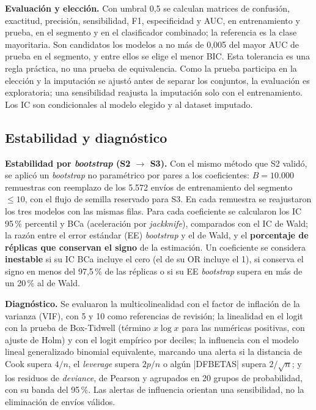 \documentclass[11pt,a4paper]{article}
\begin{document}
\textbf{Evaluación y elección.} Con umbral 0,5 se calculan matrices de confusión, exactitud, precisión, sensibilidad, F1, especificidad y AUC, en entrenamiento y prueba, en el segmento y en el clasificador combinado; la referencia es la clase mayoritaria. Son candidatos los modelos a no más de 0,005 del mayor AUC de prueba en el segmento, y entre ellos se elige el menor BIC. Esta tolerancia es una regla práctica, no una prueba de equivalencia. Como la prueba participa en la elección y la imputación se ajustó antes de separar los conjuntos, la evaluación es exploratoria; una sensibilidad reajusta la imputación solo con el entrenamiento. Los IC son condicionales al modelo elegido y al dataset imputado.

\subsection{Estabilidad y diagnóstico}
\textbf{Estabilidad por \emph{bootstrap} (S2 $\to$ S3).} Con el mismo método que S2 validó, se aplicó un \emph{bootstrap} no paramétrico por pares a los coeficientes: $B = 10.000$ remuestras con reemplazo de los 5.572 envíos de entrenamiento del segmento $\le 10$, con el flujo de semilla reservado para S3. En cada remuestra se reajustaron los tres modelos con las mismas filas. Para cada coeficiente se calcularon los IC 95\,\% percentil y BCa (aceleración por \emph{jackknife}), comparados con el IC de Wald; la razón entre el error estándar (EE) \emph{bootstrap} y el de Wald, y el \textbf{porcentaje de réplicas que conservan el signo} de la estimación. Un coeficiente se considera \textbf{inestable} si su IC BCa incluye el cero (el de su OR incluye el 1), si conserva el signo en menos del 97,5\,\% de las réplicas o si su EE \emph{bootstrap} supera en más de un 20\,\% al de Wald.

\textbf{Diagnóstico.} Se evaluaron la multicolinealidad con el factor de inflación de la varianza (VIF), con 5 y 10 como referencias de revisión; la linealidad en el logit con la prueba de Box-Tidwell (término $x \log x$ para las numéricas positivas, con ajuste de Holm) y con el logit empírico por deciles; la influencia con el modelo lineal generalizado binomial equivalente, marcando una alerta si la distancia de Cook supera $4/n$, el \emph{leverage} supera $2p/n$ o algún |DFBETAS| supera $2/\sqrt{n}$; y los residuos de \emph{deviance}, de Pearson y agrupados en 20 grupos de probabilidad, con su banda del 95\,\%. Las alertas de influencia orientan una sensibilidad, no la eliminación de envíos válidos.
\end{document}
